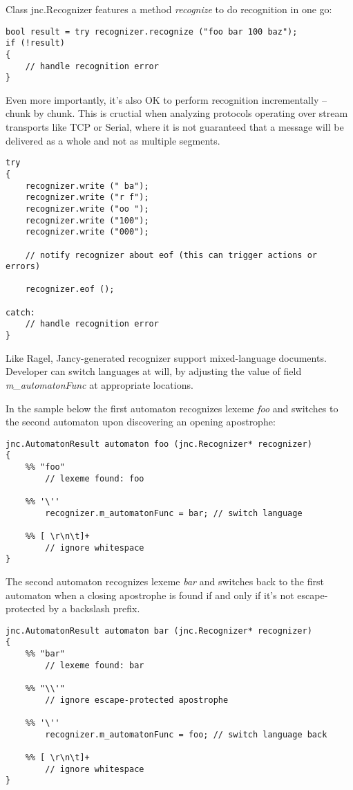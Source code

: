 \documentclass[oneside]{book}
\begin{document}
Class jnc.Recognizer features a method \emph{recognize} to do recognition in one go:

\begin{lstlisting}
bool result = try recognizer.recognize ("foo bar 100 baz");
if (!result)
{
    // handle recognition error 
}
\end{lstlisting}

Even more importantly, it's also OK to perform recognition incrementally -- chunk by chunk. This is cructial when analyzing protocols operating over stream transports like TCP or Serial, where it is not guaranteed that a message will be delivered as a whole and not as multiple segments.

\begin{lstlisting}
try 
{
    recognizer.write (" ba");
    recognizer.write ("r f");
    recognizer.write ("oo ");
    recognizer.write ("100");
    recognizer.write ("000");

    // notify recognizer about eof (this can trigger actions or errors)

    recognizer.eof (); 

catch: 
    // handle recognition error
}
\end{lstlisting}

Like Ragel, Jancy-generated recognizer support mixed-language documents. Developer can switch languages at will, by adjusting the value of field \emph{m\_automatonFunc} at appropriate locations.

In the sample below the first automaton recognizes lexeme \emph{foo} and switches to the second automaton upon discovering an opening apostrophe:

\begin{lstlisting}
jnc.AutomatonResult automaton foo (jnc.Recognizer* recognizer)
{
    %% "foo"
        // lexeme found: foo

    %% '\''
        recognizer.m_automatonFunc = bar; // switch language

    %% [ \r\n\t]+
        // ignore whitespace
}
\end{lstlisting}

The second automaton recognizes lexeme \emph{bar} and switches back to the first automaton when a closing apostrophe is found if and only if it's not escape-protected by a backslash prefix.

\begin{lstlisting}
jnc.AutomatonResult automaton bar (jnc.Recognizer* recognizer)
{
    %% "bar"
        // lexeme found: bar

    %% "\\'"
        // ignore escape-protected apostrophe

    %% '\''
        recognizer.m_automatonFunc = foo; // switch language back

    %% [ \r\n\t]+
        // ignore whitespace
}
\end{lstlisting}
\end{document}
